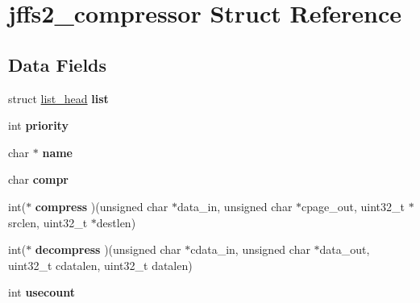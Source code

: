 \hypertarget{structjffs2__compressor}{}\section{jffs2\+\_\+compressor Struct Reference}
\label{structjffs2__compressor}
\subsection*{Data Fields}
\begin{DoxyCompactItemize}
\item 
\mbox{\label{structjffs2__compressor_af786e7d0590cfc5d1826083d751128da}} 
struct \mbox{\hyperlink{structlist__head}{list\+\_\+head}} {\bfseries list}
\item 
\mbox{\label{structjffs2__compressor_ae37a4b791dc9c42c2ead3aa1dd285e6b}} 
int {\bfseries priority}
\item 
\mbox{\label{structjffs2__compressor_a65b2c32efc032b0ff24e77c7a5249759}} 
char $\ast$ {\bfseries name}
\item 
\mbox{\label{structjffs2__compressor_a9c7066ea1f8ba7859a5cc206e8f879c9}} 
char {\bfseries compr}
\item 
\mbox{\label{structjffs2__compressor_a6cbc02114265e1527c8bcac0305f591c}} 
int($\ast$ {\bfseries compress} )(unsigned char $\ast$data\+\_\+in, unsigned char $\ast$cpage\+\_\+out, uint32\+\_\+t $\ast$srclen, uint32\+\_\+t $\ast$destlen)
\item 
\mbox{\label{structjffs2__compressor_a4e2ba11f91cbff712332a60f784b70b1}} 
int($\ast$ {\bfseries decompress} )(unsigned char $\ast$cdata\+\_\+in, unsigned char $\ast$data\+\_\+out, uint32\+\_\+t cdatalen, uint32\+\_\+t datalen)
\item 
\mbox{\label{structjffs2__compressor_ad36ec38280feb52705d5e760cb4c76a1}} 
int {\bfseries usecount}
\item 
\mbox{\label{structjffs2__compressor_a7ad5952e195e4995bb6fcfdb497544eb}} 

\end{DoxyCompactItemize}
